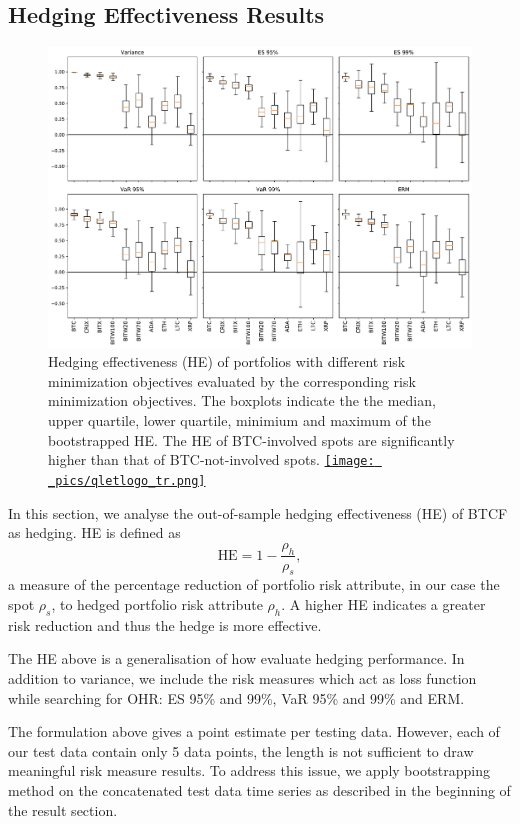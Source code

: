 \subsection{Hedging Effectiveness Results}\label{sec: HE results}
\begin{figure}[t]
\includegraphics[width=\textwidth]{_pics/ES5_HE_boxplot.pdf}
  \caption{Hedging effectiveness (HE) of portfolios with different risk minimization objectives evaluated by the corresponding risk minimization objectives.
            The boxplots indicate the the median, upper quartile, lower quartile, minimium and maximum of the bootstrapped HE.
            The HE of BTC-involved spots are significantly higher than that of BTC-not-involved spots.
  \href{http://www.quantlet.com/}{\texttt{[image: \_pics/qletlogo\_tr.png]}} }
\label{fig:HEboxplot}
\end{figure}
In this section, we analyse the out-of-sample hedging effectiveness (HE) of BTCF as hedging.
HE is defined as $$\text{HE} = 1-\frac{\rho_h}{\rho_s},$$
a measure of the percentage reduction of portfolio risk attribute, in our case the spot $\rho_s$,
to hedged portfolio risk attribute $\rho_h$.
A higher HE indicates a greater risk reduction and thus the hedge is more effective. \medskip

The HE above is a generalisation of how \citet{ederington1979hedging} evaluate hedging performance.
In addition to variance, we include the risk measures which act as loss function while searching for OHR: ES 95\% and 99\%, VaR 95\% and 99\% and ERM. \medskip

The formulation above gives a point estimate per testing data.
However, each of our test data contain only 5 data points, the length is not sufficient to draw meaningful risk measure results.
To address this issue, we apply bootstrapping method on the concatenated test data time series as described in the beginning of the result section. \medskip

